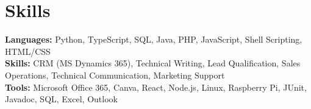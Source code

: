 \documentclass[11pt]{article}       %
\begin{document}

\vspace{-18.5pt}

\section*{Skills}
\textbf{Languages:} Python, TypeScript, SQL, Java, PHP, JavaScript, Shell Scripting, HTML/CSS\\
\textbf{Skills:} CRM (MS Dynamics 365), Technical Writing, Lead Qualification, Sales Operations, Technical Communication, Marketing Support\\
\textbf{Tools:} Microsoft Office 365, Canva, React, Node.js, Linux, Raspberry Pi, JUnit, Javadoc, SQL, Excel, Outlook\\

\vspace{-6.5pt}
\end{document}
